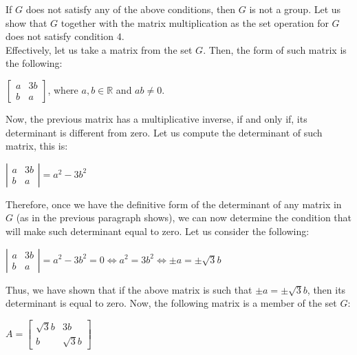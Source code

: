\documentclass[a4paper,openany,11pt]{book}
\begin{document}
If $G$ does not satisfy any of the above conditions, then $G$ is not a group. Let us show that $G$ together with the matrix multiplication as the set operation for $G$ does not satisfy condition $4$.\\

Effectively, let us take a matrix from the set $G$. Then, the form of such matrix is the following:

\begin{center}
	$\left[\begin{array}{cc}
	a & 3b\\
	b & a
	\end{array}\right]$, \hspace{0.1cm} where $a, b \in \mathbb{R}$ and $ab \neq 0$.
\end{center}

Now, the previous matrix has a multiplicative inverse, if and only if, its determinant is different from zero. Let us compute the determinant of such matrix, this is:

\begin{center}
	$\left|\begin{array}{cc}
	a & 3b\\
	b & a
	\end{array}\right| = a^{2} - 3b^{2}$
\end{center}

Therefore, once we have the definitive form of the determinant of any matrix in $G$ (as in the previous paragraph shows), we can now determine the condition that will make such determinant equal to zero. Let us consider the following:

\begin{center}
	$\left|\begin{array}{cc}
	a & 3b\\
	b & a
	\end{array}\right| = a^{2} - 3b^{2} = 0 \iff  a^{2} = 3b^{2} \iff \pm a = \pm\sqrt{3}b$
\end{center} 

Thus, we have shown that if the above matrix is such that $\pm a = \pm\sqrt{3}b$, then its determinant is equal to zero. Now, the following matrix is a member of the set $G$:

\begin{center}
	$A = \left[\begin{array}{cc}
	\sqrt{3}b & 3b\\
	b & \sqrt{3}b
	\end{array}\right]$
\end{center}
\end{document}
